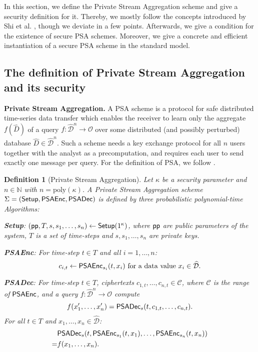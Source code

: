 \documentclass[10pt]{extarticle}
\newtheorem{Def}{Definition}
\begin{document}
In this section, we define the Private Stream Aggregation scheme and give a security definition for it. Thereby, we mostly follow the concepts introduced by Shi et al. \cite{2}, though we deviate in a few points. Afterwards, we give a condition for the existence of secure PSA schemes. Moreover, we give a concrete and efficient instantiation of a secure PSA scheme in the standard model.

\subsection{The definition of Private Stream Aggregation and its security}

\noindent\textbf{Private Stream Aggregation.} A PSA scheme is a protocol for safe distributed time-series data transfer which enables the receiver to learn only the aggregate $f(\widehat{D})$ of a query $f:\widehat{\mathcal{D}}^n\to\mathcal{O}$ over some distributed (and possibly perturbed) database $\widehat{D}\in\widehat{\mathcal{D}}^n$. Such a scheme needs a key exchange protocol for all $n$ users together with the analyst as a precomputation, and requires each user to send exactly one message per query. For the definition of PSA, we follow \cite{2}.

\begin{Def}[Private Stream Aggregation]
Let $\kappa$ be a security parameter and $n\in\mathbb{N}$ with $n=\text{poly}(\kappa)$. A Private Stream Aggregation scheme $\Sigma=(\mbox{\upshape\sffamily Setup}, \mbox{\upshape\sffamily PSAEnc}, \mbox{\upshape\sffamily PSADec})$ is defined by three probabilistic polynomial-time Algorithms:
\begin{description}
\item \textbf{\mbox{\upshape \sffamily Setup}}: $(\mbox{\upshape\sffamily pp},T,s,s_1,\ldots,s_n)\leftarrow \mbox{\upshape\sffamily Setup}(1^\kappa)$, where $\mbox{\upshape\sffamily pp}$ are public parameters of the system, $T$ is a set of time-steps and $s,s_1,\ldots,s_n$ are private keys.
\item \textbf{\mbox{\upshape \sffamily PSAEnc}}: For time-step $t\in T$ and all $i=1,\ldots,n$: 
\[c_{i,t}\leftarrow \mbox{\upshape\sffamily PSAEnc}_{s_i}(t,x_i)\mbox{ for a data value } x_i\in\widehat{\mathcal{D}}.\]
\item \textbf{\mbox{\upshape \sffamily PSADec}}: For time-step $t\in T$, ciphertexts $c_{1,t},\ldots,c_{n,t}\in\mathcal{C}$, where $\mathcal{C}$ is the range of $\mbox{\upshape \sffamily PSAEnc}$, and a query $f:\widehat{\mathcal{D}}^n\to\mathcal{O}$ compute
\[f(x'_1,\ldots,x'_n)=\mbox{\upshape\sffamily PSADec}_{s}(t,c_{1,t},\ldots,c_{n,t}).\]
For all $t\in T$ and $x_1,\ldots,x_n\in\widehat{\mathcal{D}}$:
\begin{align*}
&\mbox{\upshape\sffamily PSADec}_{s}(t, \mbox{\upshape\sffamily PSAEnc}_{s_1}(t,x_1),\ldots,\mbox{\upshape\sffamily PSAEnc}_{s_n}(t,x_n))\\
=& f(x_1,\ldots,x_n).
\end{align*}
\end{description}
\end{Def}
\end{document}
